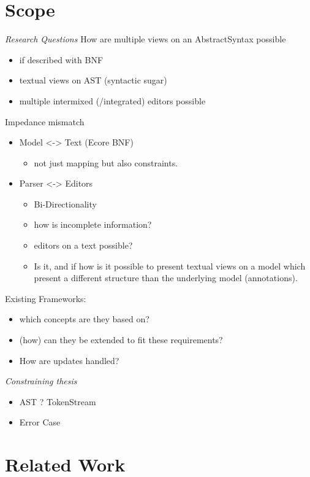 \section{Scope}
\emph{Research Questions}
How are multiple views on an AbstractSyntax possible
\begin{itemize}
	\item if described with BNF
	\item textual views on AST (syntactic sugar)
	\item multiple intermixed (/integrated) editors possible
\end{itemize}
Impedance mismatch
\begin{itemize}
	\item  Model <-> Text (Ecore BNF)
	\begin{itemize}
		\item not just mapping but also constraints.
	\end{itemize}
	\item Parser <-> Editors
	\begin{itemize}
		\item Bi-Directionality
				
		\item how is incomplete information?
		\item editors on a text possible?
		\item Is it, and if how is it possible to present textual views on a model which present a different structure than the underlying model (annotations).
	\end{itemize}
\end{itemize}
Existing Frameworks:
\begin{itemize}
	\item  which concepts are they based on?
	\item  (how) can they be extended to fit these requirements?
	\item  How are updates handled?
\end{itemize}

\emph{Constraining thesis}
\begin{itemize}
	\item  AST ? TokenStream
	\item  Error Case
\end{itemize}


\section{Related Work}

